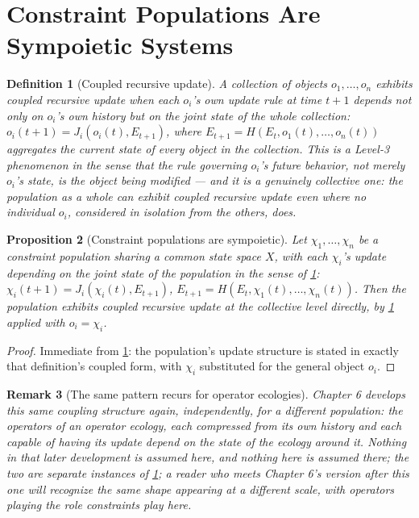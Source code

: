 \documentclass[12pt]{report}
\newtheorem{definition}{Definition}[section]
\newtheorem{proposition}[definition]{Proposition}
\newtheorem{remark}[definition]{Remark}
\begin{document}
\section{Constraint Populations Are Sympoietic Systems}

\begin{definition}[Coupled recursive update]
\label{def:coupled-recursive}
A collection of objects $o_1, \ldots, o_n$ exhibits coupled recursive
update when each $o_i$'s own update rule at time $t+1$ depends not only
on $o_i$'s own history but on the joint state of the whole collection:
$o_i(t+1) = J_i(o_i(t), E_{t+1})$, where $E_{t+1} = H(E_t, o_1(t),
\ldots, o_n(t))$ aggregates the current state of every object in the
collection. This is a Level-3 phenomenon in the sense that the rule
governing $o_i$'s future behavior, not merely $o_i$'s state, is the
object being modified --- and it is a genuinely collective one: the
population as a whole can exhibit coupled recursive update even where no
individual $o_i$, considered in isolation from the others, does.
\end{definition}

\begin{proposition}[Constraint populations are sympoietic]
\label{prop:sympoietic}
Let $\chi_1, \ldots, \chi_n$ be a constraint population sharing a common
state space $X$, with each $\chi_i$'s update depending on the joint
state of the population in the sense of \cref{def:coupled-recursive}:
$\chi_i(t+1) = J_i(\chi_i(t), E_{t+1})$, $E_{t+1} = H(E_t, \chi_1(t),
\ldots, \chi_n(t))$. Then the population exhibits coupled recursive
update at the collective level directly, by \cref{def:coupled-recursive}
applied with $o_i = \chi_i$.
\end{proposition}

\begin{proof}
Immediate from \cref{def:coupled-recursive}: the population's update
structure is stated in exactly that definition's coupled form, with
$\chi_i$ substituted for the general object $o_i$.
\end{proof}

\begin{remark}[The same pattern recurs for operator ecologies]
\label{rem:same-pattern-ch6}
Chapter 6 develops this same coupling structure again, independently,
for a different population: the operators of an operator ecology, each
compressed from its own history and each capable of having its update
depend on the state of the ecology around it. Nothing in that later
development is assumed here, and nothing here is assumed there; the two
are separate instances of \cref{def:coupled-recursive}; a reader who
meets Chapter 6's version after this one will recognize the same shape
appearing at a different scale, with operators playing the role
constraints play here.
\end{remark}
\end{document}
